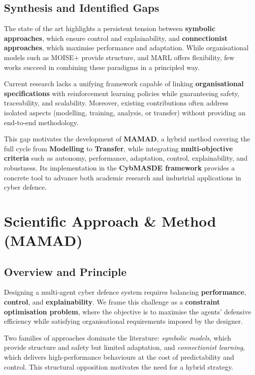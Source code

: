 \documentclass[a4paper,10pt,twocolumn]{article}
\begin{document}
\subsection{Synthesis and Identified Gaps}

The state of the art highlights a persistent tension between
\textbf{symbolic approaches}, which ensure control and explainability,
and \textbf{connectionist approaches}, which maximise performance and
adaptation. While organisational models such as MOISE+ provide
structure, and MARL offers flexibility, few works succeed in combining
these paradigms in a principled way.

Current research lacks a unifying framework capable of linking
\textbf{organisational specifications} with reinforcement learning
policies while guaranteeing safety, traceability, and scalability.
Moreover, existing contributions often address isolated aspects
(modelling, training, analysis, or transfer) without providing an
end-to-end methodology.

This gap motivates the development of \textbf{MAMAD}, a hybrid method
covering the full cycle from \textbf{Modelling} to \textbf{Transfer},
while integrating \textbf{multi-objective criteria} such as autonomy,
performance, adaptation, control, explainability, and robustness. Its
implementation in the \textbf{CybMASDE framework} provides a concrete
tool to advance both academic research and industrial applications in
cyber defence.



\section{Scientific Approach \& Method (MAMAD)}

\subsection*{Overview and Principle}

Designing a multi-agent cyber defence system requires balancing
\textbf{performance}, \textbf{control}, and \textbf{explainability}.
We frame this challenge as a \textbf{constraint optimisation problem},
where the objective is to maximise the agents’ defensive efficiency
while satisfying organisational requirements imposed by the designer.

Two families of approaches dominate the literature:
\emph{symbolic models}, which provide structure and safety but limited
adaptation, and \emph{connectionist learning}, which delivers
high-performance behaviours at the cost of predictability and control.
This structural opposition motivates the need for a hybrid strategy.
\end{document}
